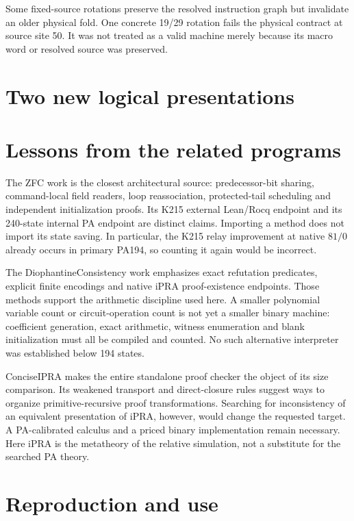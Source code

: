 \documentclass[11pt,letterpaper]{article}
\begin{document}
Some fixed-source rotations preserve the resolved instruction graph but
invalidate an older physical fold. One concrete 19/29 rotation fails
the physical contract at source site 50. It was not treated as a valid
machine merely because its macro word or resolved source was preserved.

\section{Two new logical presentations}
\label{sec:logical}



\section{Lessons from the related programs}

The ZFC work is the closest architectural source: predecessor-bit
sharing, command-local field readers, loop reassociation, protected-tail
scheduling and independent initialization proofs. Its K215 external
Lean/Rocq endpoint and its 240-state internal PA endpoint are distinct
claims. Importing a method does not import its state saving. In particular,
the K215 relay improvement at native $81/0$ already occurs in primary
PA194, so counting it again would be incorrect.\cite{zfc}

The DiophantineConsistency work emphasizes exact refutation predicates,
explicit finite encodings and native iPRA proof-existence endpoints.
Those methods support the arithmetic discipline used here. A smaller
polynomial variable count or circuit-operation count is not yet a smaller
binary machine: coefficient generation, exact arithmetic, witness
enumeration and blank initialization must all be compiled and counted.
No such alternative interpreter was established below 194 states.\cite{dio}

ConciseIPRA makes the entire standalone proof checker the object of its
size comparison. Its weakened transport and direct-closure rules suggest
ways to organize primitive-recursive proof transformations. Searching
for inconsistency of an equivalent presentation of iPRA, however, would
change the requested target. A PA-calibrated calculus and a priced binary
implementation remain necessary. Here iPRA is the metatheory of the
relative simulation, not a substitute for the searched PA theory.\cite{concise}

\section{Reproduction and use}
\end{document}
